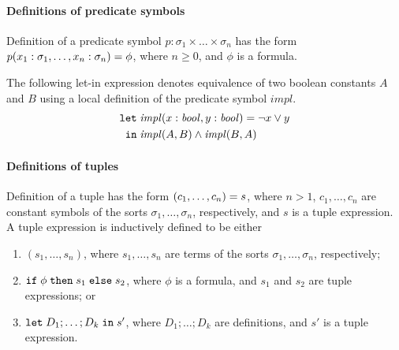 \documentclass{easychair}
\begin{document}
\paragraph{Definitions of predicate symbols}
Definition of a predicate symbol $p:\sigma_1\times\ldots\times\sigma_n$ has the
form ${p(x_1:\sigma_1,\ldots,x_n:\sigma_n)}={\phi}$, where $n \geq 0$,
and $\phi$ is a formula.

The following let-in expression denotes equivalence of two boolean constants 
$A$ and $B$ using a local definition of the predicate symbol $\mathit{impl}$.
\begin{equation}\label{eq:fool-let-impl}
\begin{aligned}
\mathtt{let}\;&{\mathit{impl}(x:\mathit{bool},y:\mathit{bool})}={\neg x \lor y}\\
 \mathtt{in}\;&\mathit{impl}(A,B)\wedge\mathit{impl}(B,A)
\end{aligned}
\end{equation}

\paragraph{Definitions of tuples}
Definition of a tuple has the form ${(c_1,\ldots,c_n)}={s}$, where
$n > 1$, $c_1,\ldots,c_n$ are constant symbols of the sorts
$\sigma_1,\ldots,\sigma_n$, respectively, and $s$ is a tuple expression.
A tuple expression is inductively defined to be either
\begin{enumerate}
  \item $(s_1,\ldots,s_n)$, where $s_1,\ldots,s_n$ are terms of the sorts
        $\sigma_1,\ldots,\sigma_n$, respectively;
  \item $\mathtt{if}\;{\phi}\;\allowbreak\mathtt{then}\;{s_1}\;\allowbreak\mathtt{else}\;{s_2}$, where $\phi$ is a formula, and $s_1$ and $s_2$
        are tuple expressions; or
  \item $\mathtt{let}\;{D_1;\ldots;D_k}\;\allowbreak\mathtt{in}\;{s'}$, where $D_1;\ldots;D_k$ are definitions,
        and $s'$ is a tuple expression.
\end{enumerate}
\end{document}

